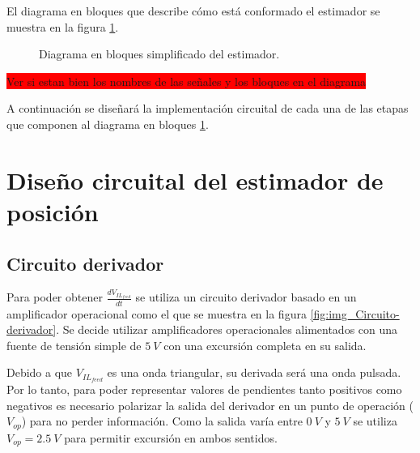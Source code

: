 El diagrama en bloques que describe cómo está conformado el estimador se muestra en la figura \ref{fig:img_diag-en-bloques_estimador}.

\begin{figure}[H]
	\centering
	
	\caption{Diagrama en bloques simplificado del estimador.}	\label{fig:img_diag-en-bloques_estimador}
\end{figure}
\colorbox{red}{Ver si estan bien los nombres de las señales y los bloques en el diagrama}

A continuación se diseñará la implementación circuital de cada una de las etapas que componen al diagrama en bloques \ref{fig:img_diag-en-bloques_estimador}.

{
	
}


\section{Diseño circuital del estimador de posición}

\subsection{Circuito derivador}

Para poder obtener $\frac{dV_{IL_{feed}}}{dt}$ se utiliza un circuito derivador basado en un amplificador operacional como el que se muestra en la figura \ref{fig:img_Circuito-derivador}. Se decide utilizar amplificadores operacionales alimentados con una fuente de tensión simple de $5\:V$ con una excursión completa en su salida. 

Debido a que $V_{IL_{feed}}$ es una onda triangular, su derivada será una onda pulsada. Por lo tanto, para poder representar valores de pendientes tanto positivos como negativos es necesario polarizar la salida del derivador en un punto de operación ($V_{op}$) para no perder información. Como la salida varía entre $0\:V$ y $5\:V$ se utiliza $V_{op}=2.5\:V$ para permitir excursión en ambos sentidos.

